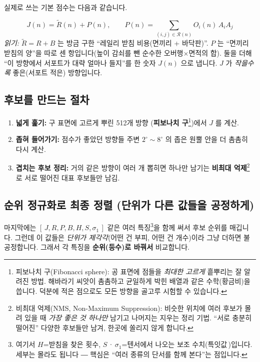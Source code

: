 \documentclass[11pt,a4paper]{article}
\begin{document}
실제로 쓰는 기본 점수는 다음과 같습니다.

\begin{equation}
J(n)=\tilde R(n)+P(n),\qquad
P(n)=\sum_{(i,j)\in\mathcal{R}(n)}O_i(n)\,A_iA_j
\label{eq:J}
\end{equation}
\noindent\textit{읽기:} $\tilde R=R+B$ 는 방금 구한 ``레일리 받침 비용(면끼리 + 바닥판)''.
$P$ 는 ``면끼리 받침의 양''을 따로 센 항입니다(높이 감쇠를 뺀 순수한 오버행$\times$면적의
합). 둘을 더해 ``이 방향에서 서포트가 대략 얼마나 들지''를 한 숫자 $J(n)$ 으로 냅니다.
$J$ 가 \emph{작을수록} 좋은(서포트 적은) 방향입니다.

\subsection{후보를 만드는 절차}

\begin{enumerate}[leftmargin=1.8em]
\item \textbf{넓게 훑기:} 구 표면에 고르게 뿌린 512개 방향
(\textbf{피보나치 구}\footnote{피보나치 구(Fibonacci sphere): 공 표면에 점들을
\emph{최대한 고르게} 흩뿌리는 잘 알려진 방법. 해바라기 씨앗이 촘촘하고 균일하게 박힌
배열과 같은 수학(황금비)을 씁니다. 덕분에 적은 점으로도 모든 방향을 골고루 시험할 수
있습니다.})에서 $J$ 를 계산.
\item \textbf{좁혀 들어가기:} 점수가 좋았던 방향들 주변 $2^\circ\sim8^\circ$ 의
좁은 원뿔 안을 더 촘촘히 다시 계산.
\item \textbf{겹치는 후보 정리:} 거의 같은 방향이 여러 개 뽑히면 하나만 남기는
\textbf{비최대 억제}\footnote{비최대 억제(NMS, Non-Maximum Suppression): 비슷한 위치에
여러 후보가 몰려 있을 때 \emph{가장 좋은 것 하나만} 남기고 나머지는 지우는 정리 기법.
``서로 충분히 떨어진'' 다양한 후보들만 남겨, 한곳에 쏠리지 않게 합니다.}로 서로
떨어진 대표 후보들만 남김.
\end{enumerate}

\subsection{순위 정규화로 최종 정렬 (단위가 다른 값들을 공정하게)}

마지막에는 $[\,J,R,P,B,H,S,\sigma_1\,]$ 같은 여러 특징\footnote{여기서 $H$=받침을
찾은 횟수, $S$\,·\,$\sigma_1$=텐서에서 나오는 보조 수치(특잇값\,\footnotemark)입니다.
세부는 몰라도 됩니다 ― 핵심은 ``여러 종류의 단서를 함께 본다''는 점입니다.}을 함께 써서 후보 순위를 매깁니다. 그런데 이 값들은
\emph{단위가 제각각}(어떤 건 부피, 어떤 건 개수)이라 그냥 더하면 불공정합니다.
그래서 각 특징을 \textbf{순위(등수)로 바꿔서} 비교합니다.
\end{document}
